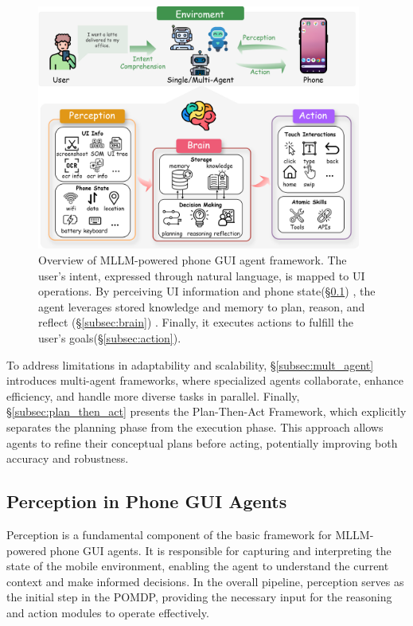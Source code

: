 \begin{figure}[ht]
    \centering
    \includegraphics[width=0.95\textwidth]{figures/phone_agent_framework.drawio.png}
    \caption{Overview of MLLM-powered phone GUI agent framework. The user's intent, expressed through natural language, is mapped to UI operations. By perceiving UI information and phone state(\S\ref{subsec:perception}) , the agent leverages stored knowledge and memory to plan, reason, and reflect (\S\ref{subsec:brain}) . Finally, it executes actions to fulfill the user's goals(\S\ref{subsec:action}).}
    \label{fig:phone_agent_framework}
\end{figure}

To address limitations in adaptability and scalability, \S\ref{subsec:mult_agent} introduces multi-agent frameworks, where specialized agents collaborate, enhance efficiency, and handle more diverse tasks in parallel. Finally, \S\ref{subsec:plan_then_act} presents the Plan-Then-Act Framework, which explicitly separates the planning phase from the execution phase. This approach allows agents to refine their conceptual plans before acting, potentially improving both accuracy and robustness.


\subsection{Perception in Phone GUI Agents}
\label{subsec:perception}

Perception is a fundamental component of the basic framework for MLLM-powered phone GUI agents. It is responsible for capturing and interpreting the state of the mobile environment, enabling the agent to understand the current context and make informed decisions. In the overall pipeline, perception serves as the initial step in the POMDP, providing the necessary input for the reasoning and action modules to operate effectively.


